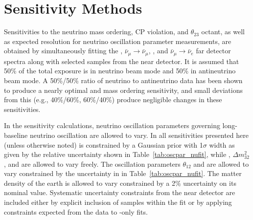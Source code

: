 \section{Sensitivity Methods}
\label{sec:physics-lbnosc-sens}




Sensitivities to the neutrino mass ordering, CP violation, and $\theta_{23}$ octant, as well as expected resolution for neutrino oscillation parameter measurements, are obtained by simultaneously fitting the \numutonumu, $\bar{\nu}_\mu \rightarrow \bar{\nu}_\mu$, \numutonue, and $\bar{\nu}_\mu \rightarrow \bar{\nu}_e$ far detector spectra along with selected samples from the near detector.  It is assumed that 50\% of the total exposure is in neutrino beam mode and 50\% in antineutrino beam mode.  A 50\%/50\% ratio of neutrino to antineutrino data has been shown to produce a nearly optimal \deltacp and mass ordering sensitivity, and small deviations from this (e.g., 40\%/60\%, 60\%/40\%) produce negligible changes in these sensitivities. %

In the sensitivity calculations, neutrino oscillation parameters governing long-baseline neutrino oscillation are allowed to vary. In all sensitivities presented here (unless otherwise noted)  is constrained by a Gaussian prior with 1$\sigma$ width as given by the relative uncertainty shown in Table~\ref{tab:oscpar_nufit}, while , $\Delta m^{2}_{32}$, and \deltacp are allowed to vary freely. The oscillation parameters $\theta_{12}$ and  are allowed to vary constrained by the uncertainty in in Table~\ref{tab:oscpar_nufit}. The matter density of the earth is allowed to vary constrained by a 2\% uncertainty on its nominal value. Systematic uncertainty constraints from the near detector are included either by explicit inclusion of  samples within the fit or by applying constraints expected from the  data to -only fits.


